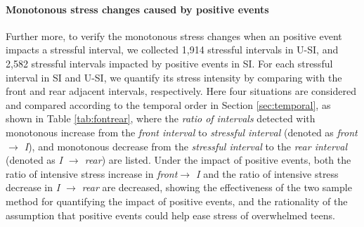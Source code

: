 \paragraph{Monotonous stress changes caused by positive events}
Further more,
to verify the monotonous stress changes when an positive event impacts a stressful interval,
we collected 1,914 stressful intervals in U-SI,
and 2,582 stressful intervals impacted by positive events in SI.
For each stressful interval in SI and U-SI,
we quantify its stress intensity by comparing with the front and rear adjacent intervals, respectively.
Here four situations are considered and compared according to the temporal order in Section \ref{sec:temporal},
as shown in Table \ref{tab:fontrear},
where the \emph{ratio of intervals} detected with monotonous increase from the \emph{front interval} to \emph{stressful interval} (denoted as \emph{front$ \rightarrow$ I}),
and monotonous decrease from the \emph{stressful interval} to the \emph{rear interval} (denoted as \emph{I $\rightarrow$ rear}) are listed.
Under the impact of positive events,
both the ratio of intensive stress increase in \emph{front$ \rightarrow$ I}
and the ratio of intensive stress decrease in \emph{I $\rightarrow$ rear} are decreased,
showing the effectiveness of the two sample method for quantifying the impact of positive events,
and the rationality of the assumption that positive events could help ease stress of overwhelmed teens.

